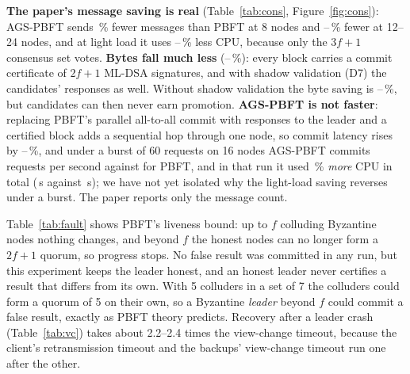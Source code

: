 \textbf{The paper's message saving is real} (Table~\ref{tab:cons},
Figure~\ref{fig:cons}): AGS-PBFT sends \,\% fewer messages
than PBFT at 8 nodes and --\,\% fewer at
12--24 nodes, and at light load it uses --\,\%
less CPU, because only the $3f+1$ consensus set votes. \textbf{Bytes fall much less}
(--\,\%): every block carries a commit
certificate of $2f+1$ ML-DSA signatures, and with shadow validation (D7) the
candidates' responses as well. Without shadow validation the byte saving is
--\,\%, but candidates can
then never earn promotion. \textbf{AGS-PBFT is not faster}: replacing PBFT's
parallel all-to-all commit with responses to the leader and a certified block
adds a sequential hop through one node, so commit latency rises by
--\,\%, and under a burst of 60 requests on 16
nodes AGS-PBFT commits  requests per second against 
for PBFT, and in that run it used \,\% \emph{more} CPU in
total (\,s against \,s); we have not yet
isolated why the light-load saving reverses under a burst. The paper reports
only the message count.

\begin{table}[h]
\centering
\caption{Fault tolerance}
\label{tab:fault}
\small

\end{table}

\begin{table}[h]
\centering
\caption{Recovery after a leader crash}
\label{tab:vc}
\small

\end{table}

Table~\ref{tab:fault} shows PBFT's liveness bound: up to $f$ colluding
Byzantine nodes nothing changes, and beyond $f$ the honest nodes can no longer
form a $2f+1$ quorum, so progress stops. No false result was committed in any
run, but this experiment keeps the leader honest, and an honest leader never
certifies a result that differs from its own. With 5 colluders in a set of 7
the colluders could form a quorum of 5 on their own, so a Byzantine
\emph{leader} beyond $f$ could commit a false result, exactly as PBFT theory
predicts. Recovery after a leader crash (Table~\ref{tab:vc}) takes about
2.2--2.4 times the view-change timeout, because the client's retransmission
timeout and the backups' view-change timeout run one after the other.

